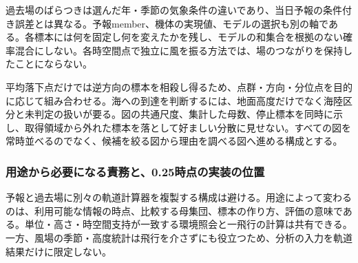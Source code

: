 \documentclass[11pt,a4paper]{article}
\begin{document}
過去場のばらつきは選んだ年・季節の気象条件の違いであり、当日予報の条件付き誤差とは異なる。予報member、機体の実現値、モデルの選択も別の軸である。各標本には何を固定し何を変えたかを残し、モデルの和集合を根拠のない確率混合にしない。各時空間点で独立に風を振る方法では、場のつながりを保持したことにならない。

平均落下点だけでは逆方向の標本を相殺し得るため、点群・方向・分位点を目的に応じて組み合わせる。海への到達を判断するには、地面高度だけでなく海陸区分と未判定の扱いが要る。図の共通尺度、集計した母数、停止標本を同時に示し、取得領域から外れた標本を落として好ましい分散に見せない。すべての図を常時並べるのでなく、候補を絞る図から理由を調べる図へ進める構成とする。

\subsubsection{用途から必要になる責務と、0.25時点の実装の位置}\label{ux7528ux9014ux304bux3089ux5fc5ux8981ux306bux306aux308bux8cacux52d9ux30680.25ux6642ux70b9ux306eux5b9fux88c5ux306eux4f4dux7f6e}

予報と過去場に別々の軌道計算器を複製する構成は避ける。用途によって変わるのは、利用可能な情報の時点、比較する母集団、標本の作り方、評価の意味である。単位・高さ・時空間支持が一致する環境照会と一飛行の計算は共有できる。一方、風場の季節・高度統計は飛行を介さずにも役立つため、分析の入力を軌道結果だけに限定しない。
\end{document}
